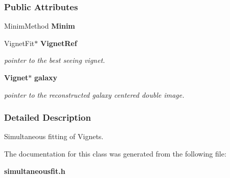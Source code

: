 \subsubsection*{Public Attributes}
\begin{CompactItemize}
\item 
{}
Minim\-Method {\bf Minim}\label{class_simultaneousfit_m0}

\item 
{}
Vignet\-Fit$\ast$ {\bf Vignet\-Ref}\label{class_simultaneousfit_m1}

\begin{CompactList}\small\item\em pointer to the best seeing vignet.\item\end{CompactList}\item 
{}
{\bf Vignet}$\ast$ {\bf galaxy}\label{class_simultaneousfit_m2}

\begin{CompactList}\small\item\em pointer to the reconstructed galaxy centered double image.\item\end{CompactList}\end{CompactItemize}


\subsubsection{Detailed Description}
Simultaneous fitting of Vignets.



The documentation for this class was generated from the following file:\begin{CompactItemize}
\item 
{\bf simultaneousfit.h}\end{CompactItemize}
